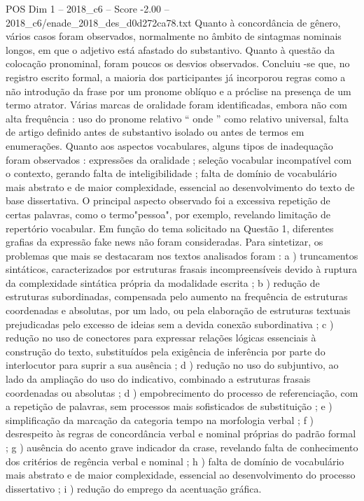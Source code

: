 \begin{textsample}{POS Dim 1 – 2018\_c6 – Score -2.00 – 2018\_c6/enade\_2018\_des\_d0d272ca78.txt}
Quanto à concordância de gênero, vários casos foram observados, normalmente no âmbito de sintagmas nominais longos, em que o adjetivo está afastado do substantivo.
Quanto à questão da colocação pronominal, foram poucos os desvios observados.
Concluiu -se que, no registro escrito formal, a maioria dos participantes já incorporou regras como a não introdução da frase por um pronome oblíquo e a próclise na presença de um termo atrator.
Várias marcas de oralidade foram identificadas, embora não com alta frequência : uso do pronome relativo “ onde ” como relativo universal, falta de artigo definido antes de substantivo isolado ou antes de termos em enumerações.
Quanto aos aspectos vocabulares, alguns tipos de inadequação foram observados : expressões da oralidade ; seleção vocabular incompatível com o contexto, gerando falta de inteligibilidade ; falta de domínio de vocabulário mais abstrato e de maior complexidade, essencial ao desenvolvimento do texto de base dissertativa.
O principal aspecto observado foi a excessiva repetição de certas palavras, como o termo"pessoa", por exemplo, revelando limitação de repertório vocabular.
Em função do tema solicitado na Questão 1, diferentes grafias da expressão fake news não foram consideradas.
Para sintetizar, os problemas que mais se destacaram nos textos analisados foram : a ) truncamentos sintáticos, caracterizados por estruturas frasais incompreensíveis devido à ruptura da complexidade sintática própria da modalidade escrita ; b ) redução de estruturas subordinadas, compensada pelo aumento na frequência de estruturas coordenadas e absolutas, por um lado, ou pela elaboração de estruturas textuais prejudicadas pelo excesso de ideias sem a devida conexão subordinativa ; c ) redução no uso de conectores para expressar relações lógicas essenciais à construção do texto, substituídos pela exigência de inferência por parte do interlocutor para suprir a sua ausência ; d ) redução no uso do subjuntivo, ao lado da ampliação do uso do indicativo, combinado a estruturas frasais coordenadas ou absolutas ; d ) empobrecimento do processo de referenciação, com a repetição de palavras, sem processos mais sofisticados de substituição ; e ) simplificação da marcação da categoria tempo na morfologia verbal ; f ) desrespeito às regras de concordância verbal e nominal próprias do padrão formal ; g ) ausência do acento grave indicador da crase, revelando falta de conhecimento dos critérios de regência verbal e nominal ; h ) falta de domínio de vocabulário mais abstrato e de maior complexidade, essencial ao desenvolvimento do processo dissertativo ; i ) redução do emprego da acentuação gráfica.

\end{textsample}
